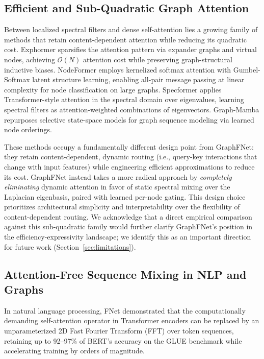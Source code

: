 \documentclass[10pt]{article}
\begin{document}
\subsection{Efficient and Sub-Quadratic Graph Attention}
Between localized spectral filters and dense self-attention lies a growing family of methods that retain content-dependent attention while reducing its quadratic cost. Exphormer \citep{shirzad2023exphormer} sparsifies the attention pattern via expander graphs and virtual nodes, achieving $\mathcal{O}(N)$ attention cost while preserving graph-structural inductive biases. NodeFormer \citep{wu2022nodeformer} employs kernelized softmax attention with Gumbel-Softmax latent structure learning, enabling all-pair message passing at linear complexity for node classification on large graphs. Specformer \citep{bo2023specformer} applies Transformer-style attention in the spectral domain over eigenvalues, learning spectral filters as attention-weighted combinations of eigenvectors. Graph-Mamba \citep{wang2024graphmamba} repurposes selective state-space models for graph sequence modeling via learned node orderings.

These methods occupy a fundamentally different design point from GraphFNet: they retain content-dependent, dynamic routing (i.e., query-key interactions that change with input features) while engineering efficient approximations to reduce its cost. GraphFNet instead takes a more radical approach by \textit{completely eliminating} dynamic attention in favor of static spectral mixing over the Laplacian eigenbasis, paired with learned per-node gating. This design choice prioritizes architectural simplicity and interpretability over the flexibility of content-dependent routing. We acknowledge that a direct empirical comparison against this sub-quadratic family would further clarify GraphFNet's position in the efficiency-expressivity landscape; we identify this as an important direction for future work (Section~\ref{sec:limitations}).

\subsection{Attention-Free Sequence Mixing in NLP and Graphs}
In natural language processing, FNet \citep{lee-thorp2022fnet} demonstrated that the computationally demanding self-attention operator in Transformer encoders can be replaced by an unparameterized 2D Fast Fourier Transform (FFT) over token sequences, retaining up to 92--97\% of BERT's accuracy on the GLUE benchmark while accelerating training by orders of magnitude. 
\end{document}
